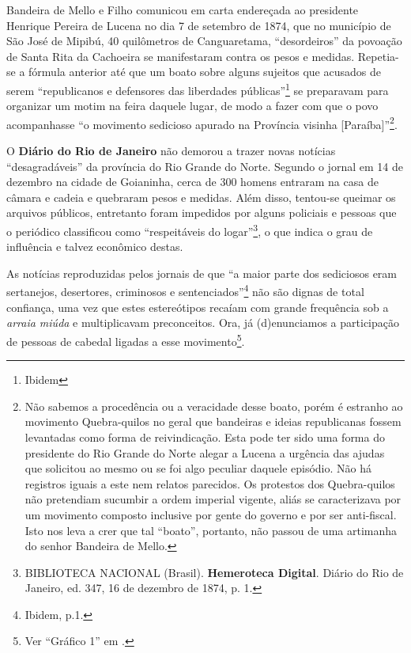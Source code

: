 \begin{refsection}
Bandeira de Mello e Filho comunicou em carta endereçada ao presidente Henrique Pereira de Lucena no dia 7 de setembro de 1874, que no município de São José de Mipibú, 40 quilômetros de Canguaretama, “desordeiros” da povoação de Santa Rita da Cachoeira se manifestaram contra os pesos e medidas. Repetia-se a fórmula anterior até que um boato sobre alguns sujeitos que acusados de serem “republicanos e defensores das liberdades públicas”\footnote{Ibidem} se preparavam para organizar um motim na feira daquele lugar, de modo a fazer com que o povo acompanhasse “o movimento sedicioso apurado na Província visinha [Paraíba]”\footnote{Não sabemos a procedência ou a veracidade desse boato, porém é estranho ao movimento Quebra-quilos no geral que bandeiras e ideias republicanas fossem levantadas como forma de reivindicação. Esta pode ter sido uma forma do presidente do Rio Grande do Norte alegar a Lucena a urgência das ajudas que solicitou ao mesmo ou se foi algo peculiar daquele episódio. Não há registros iguais a este nem relatos parecidos. Os protestos dos Quebra-quilos não pretendiam sucumbir a ordem imperial vigente, aliás se caracterizava por um movimento composto inclusive por gente do governo e por ser anti-fiscal. Isto nos leva a crer que tal “boato”, portanto, não passou de uma artimanha do senhor Bandeira de Mello.}.

O \textbf{Diário do Rio de Janeiro} não demorou a trazer novas notícias “desagradáveis” da província do Rio Grande do Norte. Segundo o jornal em 14 de dezembro na cidade de Goianinha, cerca de 300 homens entraram na casa de câmara e cadeia e quebraram pesos e medidas. Além disso, tentou-se queimar os arquivos públicos, entretanto foram impedidos por alguns policiais e pessoas que o periódico classificou como “respeitáveis do logar”\footnote{BIBLIOTECA NACIONAL (Brasil). \textbf{Hemeroteca Digital}. Diário do Rio de Janeiro, ed. 347, 16 de dezembro de 1874, p. 1.}, o que indica o grau de influência e talvez econômico destas.

As notícias reproduzidas pelos jornais de que “a maior parte dos sediciosos eram sertanejos, desertores, criminosos e sentenciados”\footnote{Ibidem, p.1.} não são dignas de total confiança, uma vez que estes estereótipos recaíam com grande frequência sob a \textit{arraia miúda} e multiplicavam preconceitos. Ora, já (d)enunciamos a participação de pessoas de cabedal ligadas a esse movimento\footnote{Ver ``Gráfico 1'' em .}.


\end{refsection}
